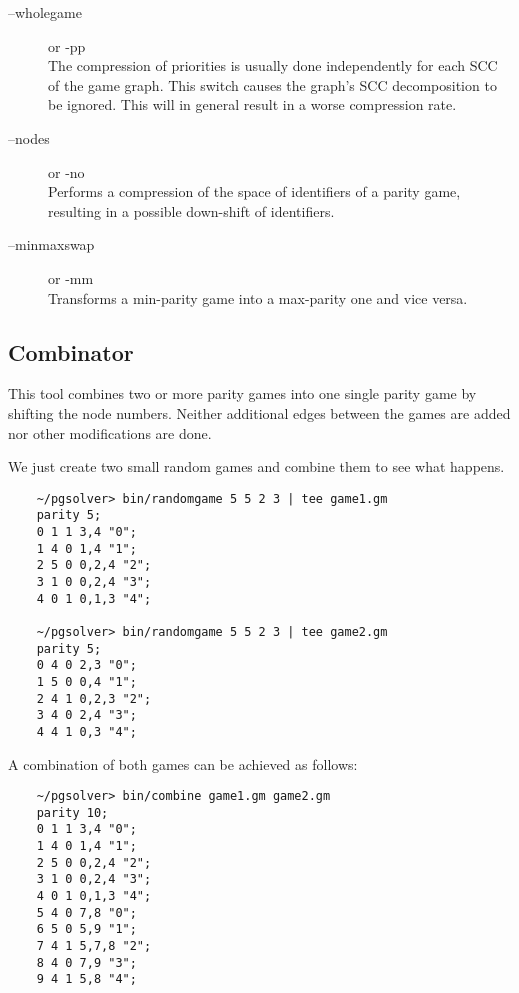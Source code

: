\begin{description}
\item[{\ttfamily --wholegame}] \enspace or {\ttfamily -pp} \\
    The compression of priorities is usually done independently for each SCC of the game graph.
    This switch causes the graph's SCC decomposition to be ignored. This will in general result
    in a worse compression rate.

\item[{\ttfamily --nodes}] \enspace or {\ttfamily -no} \\
    Performs a compression of the space of identifiers of a parity game, resulting in a possible
    down-shift of identifiers.

\item[{\ttfamily --minmaxswap}] \enspace or {\ttfamily -mm} \\
    Transforms a min-parity game into a max-parity one and vice versa.
\end{description}


\subsection{Combinator}

This tool combines two or more parity games into one single parity game by shifting the node numbers.
Neither additional edges between the games are added nor other modifications are done.

\begin{example}
We just create two small random games and combine them to see what happens.
\begin{verbatim}
    ~/pgsolver> bin/randomgame 5 5 2 3 | tee game1.gm
    parity 5;
    0 1 1 3,4 "0";
    1 4 0 1,4 "1";
    2 5 0 0,2,4 "2";
    3 1 0 0,2,4 "3";
    4 0 1 0,1,3 "4";

    ~/pgsolver> bin/randomgame 5 5 2 3 | tee game2.gm
    parity 5;
    0 4 0 2,3 "0";
    1 5 0 0,4 "1";
    2 4 1 0,2,3 "2";
    3 4 0 2,4 "3";
    4 4 1 0,3 "4";
\end{verbatim}
A combination of both games can be achieved as follows:
\begin{verbatim}
    ~/pgsolver> bin/combine game1.gm game2.gm
    parity 10;
    0 1 1 3,4 "0";
    1 4 0 1,4 "1";
    2 5 0 0,2,4 "2";
    3 1 0 0,2,4 "3";
    4 0 1 0,1,3 "4";
    5 4 0 7,8 "0";
    6 5 0 5,9 "1";
    7 4 1 5,7,8 "2";
    8 4 0 7,9 "3";
    9 4 1 5,8 "4";
\end{verbatim}
\end{example}

